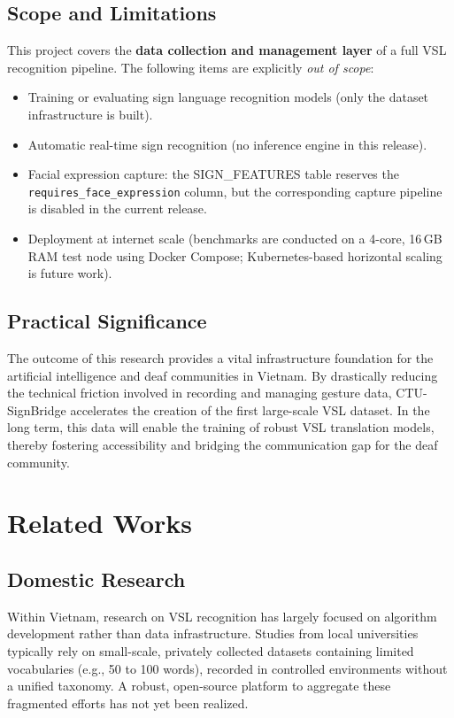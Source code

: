 \subsection{Scope and Limitations}
This project covers the \textbf{data collection and management layer} of a full VSL recognition pipeline. The following items are explicitly \textit{out of scope}:
\begin{itemize}
    \item Training or evaluating sign language recognition models (only the dataset infrastructure is built).
    \item Automatic real-time sign recognition (no inference engine in this release).
    \item Facial expression capture: the SIGN\_FEATURES table reserves the \texttt{requires\_face\_expression} column, but the corresponding capture pipeline is disabled in the current release.
    \item Deployment at internet scale (benchmarks are conducted on a 4-core, 16\,GB RAM test node using Docker Compose; Kubernetes-based horizontal scaling is future work).
\end{itemize}

\subsection{Practical Significance}
The outcome of this research provides a vital infrastructure foundation for the artificial intelligence and deaf communities in Vietnam. By drastically reducing the technical friction involved in recording and managing gesture data, CTU-SignBridge accelerates the creation of the first large-scale VSL dataset. In the long term, this data will enable the training of robust VSL translation models, thereby fostering accessibility and bridging the communication gap for the deaf community.

\section{Related Works}

\subsection{Domestic Research}
Within Vietnam, research on VSL recognition has largely focused on algorithm development rather than data infrastructure. Studies from local universities typically rely on small-scale, privately collected datasets containing limited vocabularies (e.g., 50 to 100 words), recorded in controlled environments without a unified taxonomy. A robust, open-source platform to aggregate these fragmented efforts has not yet been realized.

